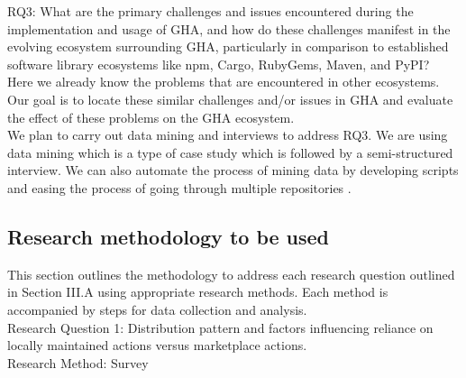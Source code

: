 \documentclass[conference]{IEEEtran}
\begin{document}
RQ3: What are the primary challenges and issues encountered during the implementation and usage of GHA, and how do these challenges manifest in the evolving ecosystem surrounding GHA, particularly in comparison to established software library ecosystems like npm, Cargo, RubyGems, Maven, and PyPI?\\

	Here we already know the problems that are encountered in other ecosystems. Our goal is to locate these similar challenges and/or issues in GHA and evaluate the effect of these problems on the GHA ecosystem.\\

	We plan to carry out data mining and interviews to address RQ3. We are using data mining which is  a type of case study which is followed by a semi-structured interview. We can also automate the process of mining data by developing scripts and easing the process of going through multiple repositories \cite{b20}.\\


\subsection{Research methodology to be used}

This section outlines the methodology to address each research question outlined in Section III.A using appropriate research methods. Each method is accompanied by steps for data collection and analysis.\\

Research Question 1: Distribution pattern and factors influencing reliance on locally maintained actions versus marketplace actions.\\

Research Method: Survey\\
\end{document}
